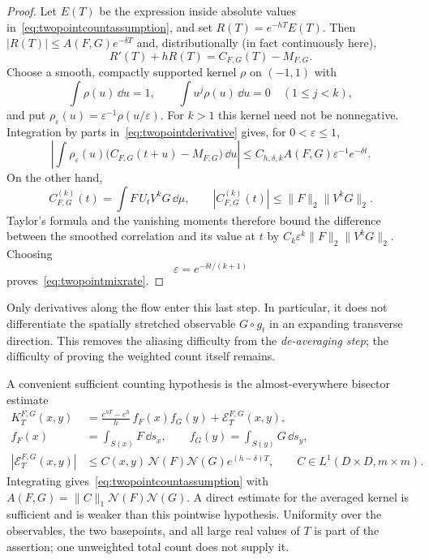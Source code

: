 \begin{proof}
Let $E(T)$ be the expression inside absolute values
in~\eqref{eq:twopointcountassumption}, and set
$R(T)=e^{-hT}E(T)$. Then $|R(T)|\leq A(F,G)e^{-\delta T}$ and,
distributionally (in fact continuously here),
\begin{equation}
 R'(T)+hR(T)=C_{F,G}(T)-M_{F,G}.
 \label{eq:twopointderivative}
\end{equation}
Choose a smooth, compactly supported kernel $\rho$ on $(-1,1)$ with
\[
 \int\rho(u)\,\dd u=1,\qquad
 \int u^j\rho(u)\,\dd u=0\quad(1\leq j<k),
\]
and put $\rho_\varepsilon(u)=\varepsilon^{-1}\rho(u/\varepsilon)$.
For $k>1$ this kernel need not be nonnegative. Integration by parts
in~\eqref{eq:twopointderivative} gives, for $0<\varepsilon\leq1$,
\[
 \left|\int\rho_\varepsilon(u)
       \bigl(C_{F,G}(t+u)-M_{F,G}\bigr)\,\dd u\right|
 \leq C_{h,\delta,k}A(F,G)\varepsilon^{-1}e^{-\delta t}.
\]
On the other hand,
\[
 C_{F,G}^{(k)}(t)
   =\int F\,U_tV^kG\,\dd\mu,
 \qquad |C_{F,G}^{(k)}(t)|
   \leq\|F\|_2\|V^kG\|_2.
\]
Taylor's formula and the vanishing moments therefore bound the
difference between the smoothed correlation and its value at $t$
by $C_k\varepsilon^k\|F\|_2\|V^kG\|_2$. Choosing
\[
 \varepsilon=e^{-\delta t/(k+1)}
\]
proves~\eqref{eq:twopointmixrate}.
\end{proof}

Only derivatives along the flow enter this last step. In particular,
it does not differentiate the spatially stretched observable
$G\circ g_t$ in an expanding transverse direction. This removes the
aliasing difficulty from the \emph{de-averaging step}; the difficulty
of proving the weighted count itself remains.

A convenient sufficient counting hypothesis is the almost-everywhere
bisector estimate
\begin{equation}
 \begin{split}
 K_T^{F,G}(x,y)
  &=\frac{e^{hT}-e^h}{h}\,
      f_F(x)f_G(y)+\mathcal E_T^{F,G}(x,y),\\
 f_F(x)&=\int_{S(x)}F\,\dd s_x,\qquad
 f_G(y)=\int_{S(y)}G\,\dd s_y,\\
 |\mathcal E_T^{F,G}(x,y)|
  &\leq C(x,y)\,\mathcal N(F)\mathcal N(G)
          e^{(h-\delta)T},\qquad
 C\in L^1(D\times D,m\times m).
 \end{split}
 \label{eq:twopointpointwise}
\end{equation}
Integrating gives~\eqref{eq:twopointcountassumption} with
$A(F,G)=\|C\|_1\mathcal N(F)\mathcal N(G)$. A direct estimate
for the averaged kernel is sufficient and is weaker than this
pointwise hypothesis. Uniformity over the observables, the two
basepoints, and all large real values of $T$ is part of the assertion;
one unweighted total count does not supply it.


